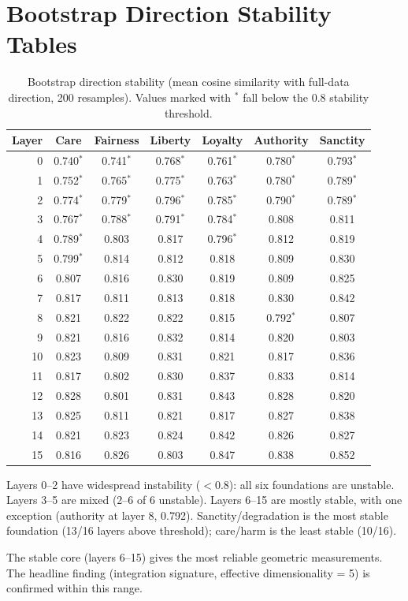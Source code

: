 \section{Bootstrap Direction Stability Tables}\label{bootstrap-direction-stability-tables}

\label{app:bootstrap}

\begin{table}[h]
\centering
\caption{Bootstrap direction stability (mean cosine similarity with full-data direction, 200 resamples). Values marked with $^*$ fall below the 0.8 stability threshold.}
\label{tab:bootstrap}
\small
\begin{tabular}{r cccccc}
\toprule
Layer & Care & Fairness & Liberty & Loyalty & Authority & Sanctity \\
\midrule
0  & 0.740$^*$ & 0.741$^*$ & 0.768$^*$ & 0.761$^*$ & 0.780$^*$ & 0.793$^*$ \\
1  & 0.752$^*$ & 0.765$^*$ & 0.775$^*$ & 0.763$^*$ & 0.780$^*$ & 0.789$^*$ \\
2  & 0.774$^*$ & 0.779$^*$ & 0.796$^*$ & 0.785$^*$ & 0.790$^*$ & 0.789$^*$ \\
3  & 0.767$^*$ & 0.788$^*$ & 0.791$^*$ & 0.784$^*$ & 0.808 & 0.811 \\
4  & 0.789$^*$ & 0.803 & 0.817 & 0.796$^*$ & 0.812 & 0.819 \\
5  & 0.799$^*$ & 0.814 & 0.812 & 0.818 & 0.809 & 0.830 \\
6  & 0.807 & 0.816 & 0.830 & 0.819 & 0.809 & 0.825 \\
7  & 0.817 & 0.811 & 0.813 & 0.818 & 0.830 & 0.842 \\
8  & 0.821 & 0.822 & 0.822 & 0.815 & 0.792$^*$ & 0.807 \\
9  & 0.821 & 0.816 & 0.832 & 0.814 & 0.820 & 0.803 \\
10 & 0.823 & 0.809 & 0.831 & 0.821 & 0.817 & 0.836 \\
11 & 0.817 & 0.802 & 0.830 & 0.837 & 0.833 & 0.814 \\
12 & 0.828 & 0.801 & 0.831 & 0.843 & 0.828 & 0.820 \\
13 & 0.825 & 0.811 & 0.821 & 0.817 & 0.827 & 0.838 \\
14 & 0.821 & 0.823 & 0.824 & 0.842 & 0.826 & 0.827 \\
15 & 0.816 & 0.826 & 0.803 & 0.847 & 0.838 & 0.852 \\
\bottomrule
\end{tabular}
\end{table}

Layers 0--2 have widespread instability (\(< 0.8\)): all six
foundations are unstable. Layers 3--5 are mixed (2--6 of 6
unstable). Layers 6--15 are mostly stable, with one exception
(authority at layer 8, 0.792). Sanctity/degradation is the most
stable foundation (13/16 layers above threshold); care/harm is
the least stable (10/16).

The stable core (layers 6--15) gives the most reliable geometric
measurements. The headline finding (integration signature, effective
dimensionality = 5) is confirmed within this range.
